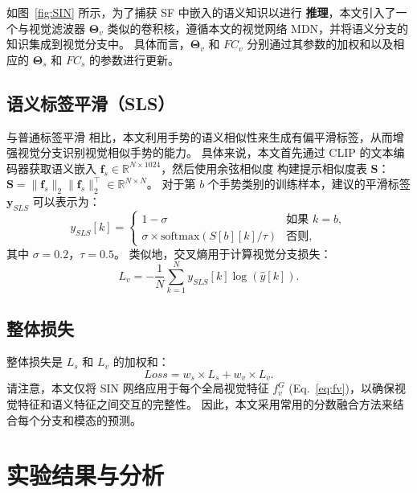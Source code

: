 如图~\ref{fig:SIN} 所示，为了捕获 SF 中嵌入的语义知识以进行 \textbf{推理}，本文引入了一个与视觉滤波器 $\boldsymbol{\Theta}_{v}$ 类似的卷积核，遵循本文的视觉网络 MDN，并将语义分支的知识集成到视觉分支中。
具体而言，$\boldsymbol{\Theta}_{v}$ 和 $FC_{v}$ 分别通过其参数的加权和以及相应的 $\boldsymbol{\Theta}_{s}$ 和 $FC_{s}$ 的参数进行更新。

\subsection{语义标签平滑（SLS）}
与普通标签平滑 \cite{he2019bag} 相比，本文利用手势的语义相似性来生成有偏平滑标签，从而增强视觉分支识别视觉相似手势的能力。
具体来说，本文首先通过 CLIP 的文本编码器获取语义嵌入 $\mathbf{f}_{s} \in \mathbb{R}^{N\times 1024}$，然后使用余弦相似度 \cite{zuo2023natural} 构建提示相似度表 $\mathbf{S}$：$\mathbf{S} = \|\mathbf{f}_{s}\|_2\|\mathbf{f}_{s}\|_2^{\top} \in \mathbb{R}^{N\times N}$。
%
对于第 $b$ 个手势类别的训练样本，建议的平滑标签 $\mathbf{y}_{SLS}$ 可以表示为：
\begin{equation}
y_{SLS}[k] = \begin{cases}
1 - \sigma & \text{如果 } k = b,\\
\sigma \times \text{softmax}\left(S[b][k]/\tau\right) & \text{否则},
\end{cases}
\end{equation}
其中 $\sigma=0.2$，$\tau=0.5$。
类似地，交叉熵用于计算视觉分支损失：
\begin{equation}
L_{v} = -\frac{1}{N}\sum_{k=1}^{N}{y_{SLS}[k]\log\left(\hat{y}[k]\right)}. %
\end{equation}

\subsection{整体损失}
整体损失是 $L_{s}$ 和 $L_{v}$ 的加权和：
\begin{equation}
Loss = w_{s} \times L_{s} + w_{v} \times L_{v}.
\label{eq:overall_loss}
\end{equation}
%
请注意，本文仅将 SIN 网络应用于每个全局视觉特征 $f_v^G$ (Eq.~\ref{eq:fv})，以确保视觉特征和语义特征之间交互的完整性。
因此，本文采用常用的分数融合方法来结合每个分支和模态的预测。

\section{实验结果与分析}
\label{sec:GR_EXP}
